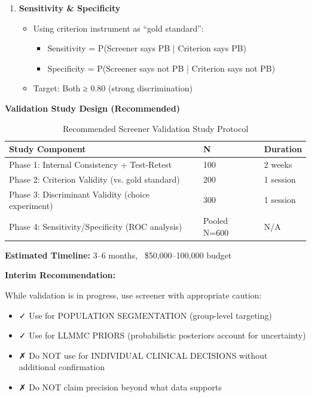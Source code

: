 \begin{enumerate}
\item \textbf{Sensitivity \& Specificity}
  \begin{itemize}[nosep]
  \item Using criterion instrument as ``gold standard'':
    \begin{itemize}[nosep]
    \item Sensitivity = P(Screener says PB | Criterion says PB)
    \item Specificity = P(Screener says not PB | Criterion says not PB)
    \end{itemize}
  \item Target: Both ≥ 0.80 (strong discrimination)
  \end{itemize}
\end{enumerate}

\textbf{Validation Study Design (Recommended)}

\begin{table}[htbp]
\centering
\caption{Recommended Screener Validation Study Protocol}
\label{tab:19-validation-protocol}
\renewcommand{\arraystretch}{1.3}
\small
\begin{tabular}{@{}lll@{}}
\toprule
\textbf{Study Component} & \textbf{N} & \textbf{Duration} \\
\midrule
Phase 1: Internal Consistency + Test-Retest & 100 & 2 weeks \\
Phase 2: Criterion Validity (vs. gold standard) & 200 & 1 session \\
Phase 3: Discriminant Validity (choice experiment) & 300 & 1 session \\
Phase 4: Sensitivity/Specificity (ROC analysis) & Pooled N=600 & N/A \\
\bottomrule
\end{tabular}
\end{table}

\textbf{Estimated Timeline:} 3--6 months, ~\$50,000--100,000 budget

\textbf{Interim Recommendation:}

While validation is in progress, use screener with appropriate caution:

\begin{itemize}[nosep]
\item ✓ Use for POPULATION SEGMENTATION (group-level targeting)
\item ✓ Use for LLMMC PRIORS (probabilistic posteriors account for uncertainty)
\item ✗ Do NOT use for INDIVIDUAL CLINICAL DECISIONS without additional confirmation
\item ✗ Do NOT claim precision beyond what data supports
\end{itemize}

